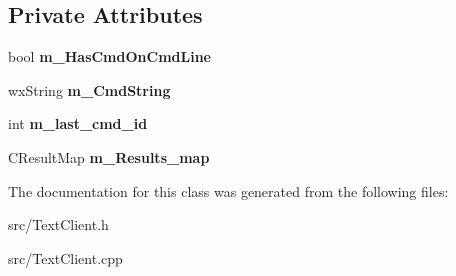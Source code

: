 \subsection*{Private Attributes}
\begin{DoxyCompactItemize}
\item 
bool {\bfseries m\_\-HasCmdOnCmdLine}\label{classCamulecmdApp_a14014c805e29ca06cb5b19f44b289f5e}

\item 
wxString {\bfseries m\_\-CmdString}\label{classCamulecmdApp_a9840868af10431fa50ac18a321b42050}

\item 
int {\bfseries m\_\-last\_\-cmd\_\-id}\label{classCamulecmdApp_a958facbdd3c35442e2cca0bf39ed88a6}

\item 
CResultMap {\bfseries m\_\-Results\_\-map}\label{classCamulecmdApp_a56fbef3c2ea094174983cd1aacf8c2de}

\end{DoxyCompactItemize}


The documentation for this class was generated from the following files:\begin{DoxyCompactItemize}
\item 
src/TextClient.h\item 
src/TextClient.cpp\end{DoxyCompactItemize}
